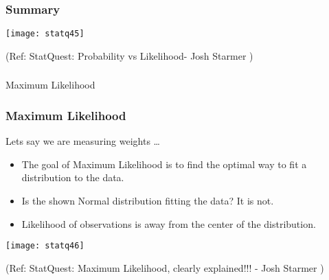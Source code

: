 \begin{frame}[fragile]\frametitle{Summary}


      \begin{center}
      \texttt{[image: statq45]}
	  
	  
	  	\end{center}

		\tiny{(Ref: StatQuest: Probability vs Likelihood- Josh Starmer )}

\end{frame}

\begin{frame}[fragile]\frametitle{}
\begin{center}
{\Large Maximum Likelihood}
\end{center}
\end{frame}

\begin{frame}[fragile]\frametitle{Maximum Likelihood}
Lets say we are measuring weights \ldots

	\begin{itemize}
	\item The goal of Maximum Likelihood is to find the optimal way to fit a distribution to the data.
	\item Is the shown Normal distribution fitting the data? It is not.
	\item Likelihood of observations is away from the center of the distribution.
	\end{itemize}

      \begin{center}
      \texttt{[image: statq46]}
	  
	  	\end{center}

		\tiny{(Ref: StatQuest: Maximum Likelihood, clearly explained!!! - Josh Starmer )}

\end{frame}


